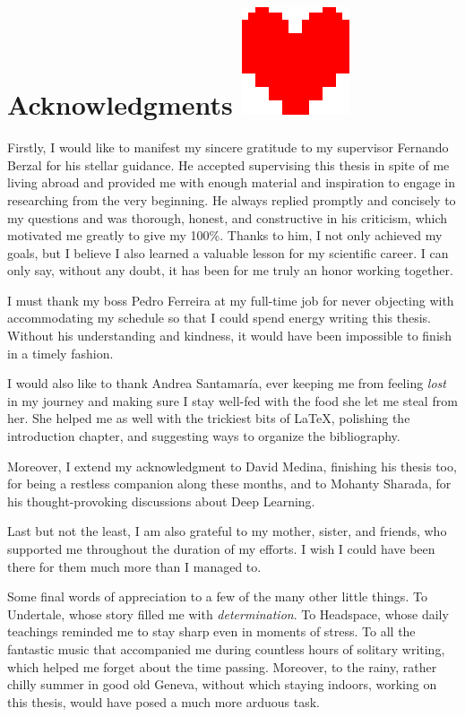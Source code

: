 
\chapter*{Acknowledgments \includegraphics[scale=0.1]{gfx/determination}}
\vspace*{-10mm}

Firstly, I would like to manifest my sincere gratitude to my supervisor Fernando Berzal for his stellar guidance.
He accepted supervising this thesis in spite of me living abroad and provided me with enough material and inspiration to engage in researching from the very beginning.
He always replied promptly and concisely to my questions and was thorough, honest, and constructive in his criticism, which motivated me greatly to give my 100\%.
Thanks to him, I not only achieved my goals, but I believe I also learned a valuable lesson for my scientific career.
I can only say, without any doubt, it has been for me truly an honor working together.

I must thank my boss Pedro Ferreira at my full-time job for never objecting with accommodating my schedule so that I could spend energy writing this thesis.
Without his understanding and kindness, it would have been impossible to finish in a timely fashion.

I would also like to thank Andrea Santamaría, ever keeping me from feeling \emph{lost} in my journey and making sure I stay well-fed with the food she let me steal from her.
She helped me as well with the trickiest bits of \LaTeX, polishing the introduction chapter, and suggesting ways to organize the bibliography.

Moreover, I extend my acknowledgment to David Medina, finishing his thesis too, for being a restless companion along these months, and to Mohanty Sharada, for his thought-provoking discussions about Deep Learning.

Last but not the least, I am also grateful to my mother, sister, and friends, who supported me throughout the duration of my efforts.
I wish I could have been there for them much more than I managed to.

Some final words of appreciation to a few of the many other little things.
To Undertale, whose story filled me with \emph{determination}.
To Headspace, whose daily teachings reminded me to stay sharp even in moments of stress.
To all the fantastic music that accompanied me during countless hours of solitary writing, which helped me forget about the time passing.
Moreover, to the rainy, rather chilly summer in good old Geneva, without which staying indoors, working on this thesis, would have posed a much more arduous task.
